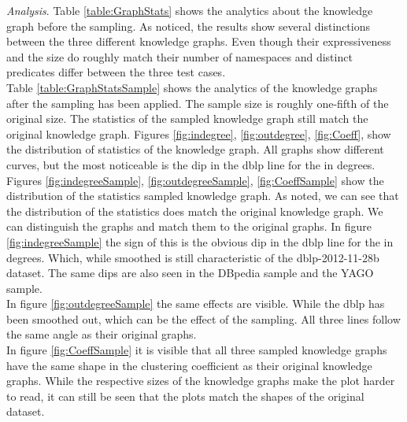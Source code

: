 \documentclass[11pt,letterpaper ,oneside ]{book}
\begin{document}
	\begin{table}[!t]
		\centering
		\caption{table showing several statistics about graphs.}
		\label{table:GraphStatsSample}
	\end{table}
	
	\textit{Analysis}. Table \ref{table:GraphStats} shows the analytics about the knowledge graph before the sampling. As noticed, the results show several distinctions between the three different knowledge graphs. Even though their expressiveness and the size do roughly match their number of namespaces and distinct predicates differ between the three test cases.\\
	Table \ref{table:GraphStatsSample} shows the analytics of the knowledge graphs after the sampling has been applied. The sample size is roughly one-fifth of the original size. The statistics of the sampled knowledge graph still match the original knowledge graph.
	Figures \ref{fig:indegree},  \ref{fig:outdegree},  \ref{fig:Coeff}, show the distribution of statistics of the knowledge graph. All graphs show different curves, but the most noticeable is the dip in the dblp line for the in degrees. 
	Figures \ref{fig:indegreeSample},  \ref{fig:outdegreeSample},  \ref{fig:CoeffSample} show the distribution of the statistics sampled knowledge graph. As noted, we can see that the distribution of the statistics does match the original knowledge graph. We can distinguish the graphs and match them to the original graphs. 
	In figure \ref{fig:indegreeSample} the sign of this is the obvious dip in the dblp line for the in degrees. Which, while smoothed is still characteristic of the dblp-2012-11-28b dataset. The same dips are also seen in the DBpedia sample and the YAGO sample.\\
	In figure \ref{fig:outdegreeSample} the same effects are visible. While the dblp has been smoothed out, which can be the effect of the sampling. All three lines follow the same angle as their original graphs.\\
	In figure \ref{fig:CoeffSample} it is visible that all three sampled knowledge graphs have the same shape in the clustering coefficient as their original knowledge graphs. While the respective sizes of the knowledge graphs make the plot harder to read, it can still be seen that the plots match the shapes of the original dataset.
	
\end{document}
